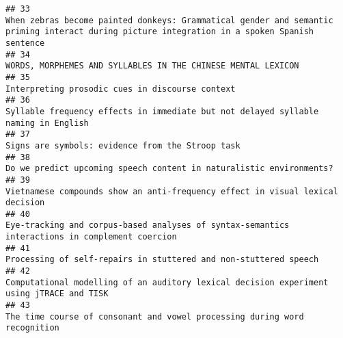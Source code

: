\documentclass[
  english,
  man]{apa6}
\begin{document}
\begin{verbatim}
## 33                                                                                              When zebras become painted donkeys: Grammatical gender and semantic priming interact during picture integration in a spoken Spanish sentence
## 34                                                                                                                                                                              WORDS, MORPHEMES AND SYLLABLES IN THE CHINESE MENTAL LEXICON
## 35                                                                                                                                                                                           Interpreting prosodic cues in discourse context
## 36                                                                                                                                                        Syllable frequency effects in immediate but not delayed syllable naming in English
## 37                                                                                                                                                                                          Signs are symbols: evidence from the Stroop task
## 38                                                                                                                                                                       Do we predict upcoming speech content in naturalistic environments?
## 39                                                                                                                                                             Vietnamese compounds show an anti-frequency effect in visual lexical decision
## 40                                                                                                                                            Eye-tracking and corpus-based analyses of syntax-semantics interactions in complement coercion
## 41                                                                                                                                                                          Processing of self-repairs in stuttered and non-stuttered speech
## 42                                                                                                                                                  Computational modelling of an auditory lexical decision experiment using jTRACE and TISK
## 43                                                                                                                                                                 The time course of consonant and vowel processing during word recognition

\end{verbatim}
\end{document}
